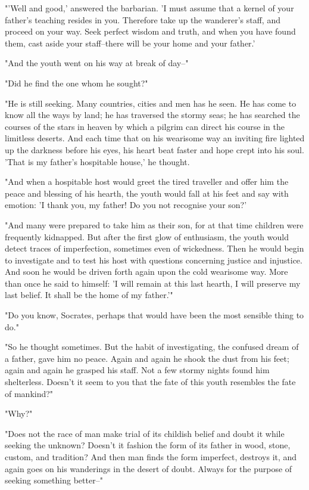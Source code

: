 "'Well and good,' answered the barbarian. 'I must assume that a kernel
of your father's teaching resides in you. Therefore take up the
wanderer's staff, and proceed on your way. Seek perfect wisdom and
truth, and when you have found them, cast aside your staff--there will
be your home and your father.'

"And the youth went on his way at break of day--"

"Did he find the one whom he sought?"

"He is still seeking. Many countries, cities and men has he seen. He
has come to know all the ways by land; he has traversed the stormy
seas; he has searched the courses of the stars in heaven by which a
pilgrim can direct his course in the limitless deserts. And each time
that on his wearisome way an inviting fire lighted up the darkness
before his eyes, his heart beat faster and hope crept into his soul.
'That is my father's hospitable house,' he thought.

"And when a hospitable host would greet the tired traveller and offer
him the peace and blessing of his hearth, the youth would fall at his
feet and say with emotion: 'I thank you, my father! Do you not
recognise your son?'

"And many were prepared to take him as their son, for at that time
children were frequently kidnapped. But after the first glow of
enthusiasm, the youth would detect traces of imperfection, sometimes
even of wickedness. Then he would begin to investigate and to test his
host with questions concerning justice and injustice. And soon he
would be driven forth again upon the cold wearisome way. More than
once he said to himself: 'I will remain at this last hearth, I will
preserve my last belief. It shall be the home of my father.'"

"Do you know, Socrates, perhaps that would have been the most sensible
thing to do."

"So he thought sometimes. But the habit of investigating, the confused
dream of a father, gave him no peace. Again and again he shook the
dust from his feet; again and again he grasped his staff. Not a few
stormy nights found him shelterless. Doesn't it seem to you that the
fate of this youth resembles the fate of mankind?"

"Why?"

"Does not the race of man make trial of its childish belief and doubt
it while seeking the unknown? Doesn't it fashion the form of its
father in wood, stone, custom, and tradition? And then man finds the
form imperfect, destroys it, and again goes on his wanderings in the
desert of doubt. Always for the purpose of seeking something better--"

